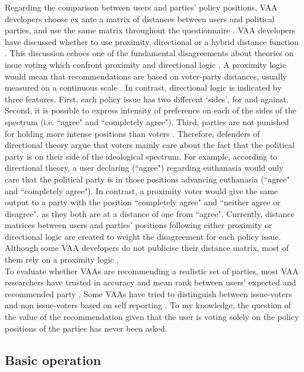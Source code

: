 \documentclass{scrartcl}
\begin{document}
Regarding the comparison between users and parties' policy positions, VAA developers choose ex ante a matrix of distances between users and political parties, and use the same matrix throughout the questionnaire \cite{Mendez2012}. VAA developers have discussed whether to use proximity, directional or a hybrid distance function \cite{Mendez2017}. This discussion echoes one of the fundamental disagreements about theories on issue voting which confront proximity and directional logic \cite{merrill1999unified}. A proximity logic would mean that recommendations are based on voter-party distances, usually measured on a continuous scale \cite{downs1957economic}. In contrast, directional logic is indicated by three features. First, each policy issue has two different ‘sides’, for and against. Second, it is possible to express intensity of preference on each of the sides of the spectrum (i.e. ``agree" and ``completely agree"). Third, parties are not punished for holding more intense positions than voters \cite{rabinowitz1989directional}. Therefore, defenders of directional theory argue that voters mainly care about the fact that the political party is on their side of the ideological spectrum. For example, according to directional theory, a user declaring (``agree") regarding euthanasia would only care that the political party is in those positions advancing euthanasia (``agree" and ``completely agree"). In contrast, a proximity voter would give the same output to a party with the position ``completely agree" and ``neither agree or disagree", as they both are at a distance of one from ``agree". Currently,  distance matrices between users and parties' positions following either proximity or directional logic are created to weight the disagreement for each policy issue. Although some VAA developers do not publicise their distance matrix, most of them rely on a proximity logic \cite{Mendez2012}. 
\\

To evaluate whether VAAs are recommending a realistic set of parties, most VAA researchers have trusted in accuracy and mean rank between users' expected and recommended party \cite{tsapatsoulis2015design}. Some VAAs have tried to distinguish between issue-voters and non issue-voters based on self reporting \cite{Mendez2017}. To my knowledge, the question of the value of the recommendation given that the user is voting solely on the policy positions of the parties has never been asked. 


\subsection{Basic operation}
\end{document}
